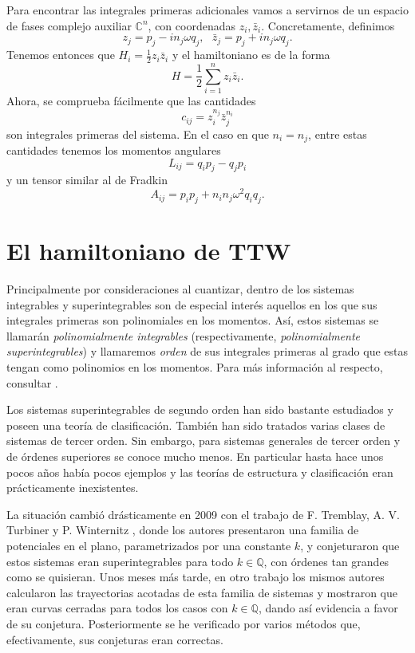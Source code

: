 \documentclass[12pt,a4paper,twoside]{article}
\theoremstyle{definition} \newtheorem{defn}[thm]{Definición}
\theoremstyle{definition} \newtheorem{ejemplo}[thm]{Ejemplo}
\theoremstyle{definition} \newtheorem{ejercicio}[thm]{Ejercicio}
\theoremstyle{remark} \newtheorem*{obs}{Observación}
\def\CC{\mathbb{C}}
\def\QQ{\mathbb{Q}}
\begin{document}
Para encontrar las integrales primeras adicionales vamos a servirnos de un espacio de fases complejo auxiliar $\CC^n$, con coordenadas $z_i, \bar{z}_i$. Concretamente, definimos
\begin{equation}
  z_j=p_j-in_j\omega q_j,\ \ \  \bar{z}_j=p_j+in_j\omega q_j.  
\end{equation}
Tenemos entonces que $H_i=\frac{1}{2}z_i\bar{z}_i$ y el hamiltoniano es de la forma
\begin{equation}
  H=\frac{1}{2}\sum_{i=1}^n z_i\bar{z}_i. 
\end{equation}
Ahora, se comprueba fácilmente que las cantidades
\begin{equation}
  c_{ij}=z_i^{n_j}\bar{z}_j^{n_i} 
\end{equation}
son integrales primeras del sistema. En el caso en que $n_i=n_j$, entre estas cantidades tenemos los momentos angulares
\begin{equation}
  L_{ij}=q_ip_j-q_jp_i 
\end{equation}
y un tensor similar al de Fradkin
\begin{equation}
  A_{ij}=p_ip_j+n_in_j\omega^2 q_iq_j. 
\end{equation}

\section{El hamiltoniano de TTW}
Principalmente por consideraciones al cuantizar, dentro de los sistemas integrables y superintegrables son de especial interés aquellos en los que sus integrales primeras son polinomiales en los momentos. Así, estos sistemas se llamarán \emph{polinomialmente integrables} (respectivamente, \emph{polinomialmente superintegrables}) y llamaremos \emph{orden} de sus integrales primeras al grado que estas tengan como polinomios en los momentos. Para más información al respecto, consultar \cite{miller}.

Los sistemas superintegrables de segundo orden han sido bastante estudiados y poseen una teoría de clasificación. También han sido tratados varias clases de sistemas de tercer orden. Sin embargo, para sistemas generales de tercer orden y de órdenes superiores se conoce mucho menos. En particular hasta hace unos pocos años había pocos ejemplos y las teorías de estructura y clasificación eran prácticamente inexistentes. 

La situación cambió drásticamente en 2009 con el trabajo de F. Tremblay, A. V. Turbiner y P. Winternitz \cite{ttw1}, donde los autores presentaron una familia de potenciales en el plano, parametrizados por una constante $k$, y conjeturaron que estos sistemas eran superintegrables para todo $k\in \QQ$, con órdenes tan grandes como se quisieran. Unos meses más tarde, en otro trabajo \cite{ttw2} los mismos autores calcularon las trayectorias acotadas de esta familia de sistemas y mostraron que eran curvas cerradas para todos los casos con $k \in \QQ$, dando así evidencia a favor de su conjetura. Posteriormente se he verificado por varios métodos que, efectivamente, sus conjeturas eran correctas.
\end{document}
